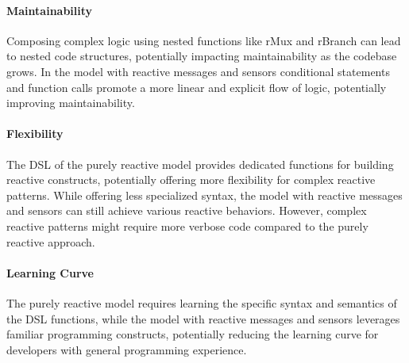 \paragraph{Maintainability}

Composing complex logic using nested functions like rMux and rBranch can lead to nested code structures, potentially impacting maintainability as the codebase grows. In the model with reactive messages and sensors conditional statements and function calls promote a more linear and explicit flow of logic, potentially improving maintainability.

\paragraph{Flexibility}

The DSL of the purely reactive model provides dedicated functions for building reactive constructs, potentially offering more flexibility for complex reactive patterns. While offering less specialized syntax, the model with reactive messages and sensors can still achieve various reactive behaviors. However, complex reactive patterns might require more verbose code compared to the purely reactive approach.

\paragraph{Learning Curve}

The purely reactive model requires learning the specific syntax and semantics of the DSL functions, while the model with reactive messages and sensors leverages familiar programming constructs, potentially reducing the learning curve for developers with general programming experience.

